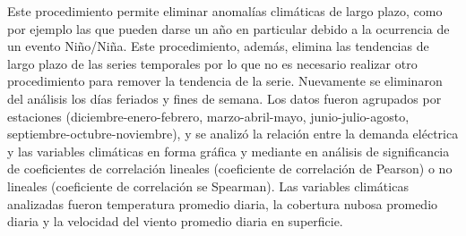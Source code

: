 \documentclass[11pt,a4paper]{article}
\begin{document}
Este procedimiento permite eliminar anomalías climáticas de largo plazo, como por ejemplo las que pueden darse un año en particular debido a la ocurrencia de un evento Niño/Niña. Este procedimiento, además, elimina las tendencias de largo plazo de las series temporales por lo que no es necesario realizar otro procedimiento para remover la tendencia de la serie. Nuevamente se eliminaron del análisis los días feriados y fines de semana. Los datos fueron agrupados por estaciones (diciembre-enero-febrero, marzo-abril-mayo, junio-julio-agosto, septiembre-octubre-noviembre), y se analizó la relación entre la demanda eléctrica y las variables climáticas en forma gráfica y mediante en análisis de significancia de coeficientes de correlación lineales (coeficiente de correlación de Pearson) o no lineales (coeficiente de correlación se Spearman).
Las variables climáticas analizadas fueron temperatura promedio diaria, la cobertura nubosa promedio diaria y la velocidad del viento promedio diaria en superficie.
\end{document}
